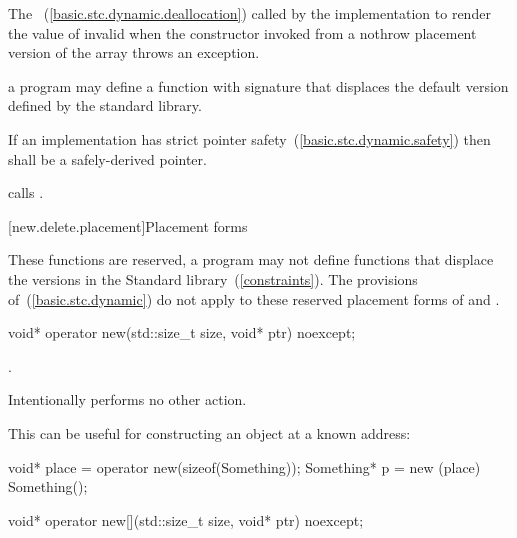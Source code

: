 \begin{itemdescr}
\pnum
\effects
The
~(\ref{basic.stc.dynamic.deallocation})
called by the implementation
to render the value of  invalid
when the constructor invoked from a nothrow
placement version of the array  throws an exception.

\pnum
\replaceable
a \Cpp program may define a function with signature
that displaces the default version defined by the
\Cpp standard library.

\pnum
\requires
If an implementation has strict pointer safety~(\ref{basic.stc.dynamic.safety})
then  shall be a safely-derived pointer.

\pnum
{}
{} calls
.
\end{itemdescr}

[new.delete.placement]{Placement forms}

\pnum
These functions are reserved, a \Cpp program may not define functions that displace
the versions in the Standard \Cpp library~(\ref{constraints}).
The provisions of~(\ref{basic.stc.dynamic}) do not apply to these reserved
placement forms of  and .

%
\begin{itemdecl}
void* operator new(std::size_t size, void* ptr) noexcept;
\end{itemdecl}

\begin{itemdescr}
\pnum
\returns
{}.

\pnum
\remarks
Intentionally performs no other action.

\pnum
\enterexample
This can be useful for constructing an object at a known address:

\begin{codeblock}
void* place = operator new(sizeof(Something));
Something* p = new (place) Something();
\end{codeblock}
\exitexample
\end{itemdescr}

%
\begin{itemdecl}
void* operator new[](std::size_t size, void* ptr) noexcept;
\end{itemdecl}

